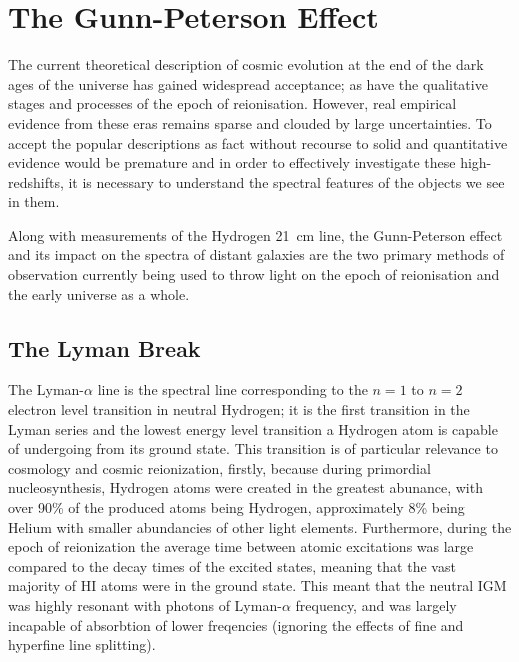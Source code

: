 
\section{The Gunn-Peterson Effect} %
\label{sec:the_gunn_peterson_effect}
	The current theoretical description of cosmic evolution at the end of the dark ages of the universe has gained widespread acceptance; as have the qualitative stages and processes of the epoch of reionisation. However, real empirical evidence from these eras remains sparse and clouded by large uncertainties. To accept the popular descriptions as fact without recourse to solid and quantitative evidence would be premature and in order to effectively investigate these high-redshifts, it is necessary to understand the spectral features of the objects we see in them.

	Along with measurements of the Hydrogen \SI{21}{\centi\metre} line, the Gunn-Peterson effect and its impact on the spectra of distant galaxies are the two primary methods of observation currently being used to throw light on the epoch of reionisation and the early universe as a whole.

	\subsection{The Lyman Break} %
	\label{sub:the_lyman_break}
		The Lyman-$\alpha$ line is the spectral line corresponding to the $n=1$ to $n=2$ electron level transition in neutral Hydrogen; it is the first transition in the Lyman series and the lowest energy level transition a Hydrogen atom is capable of undergoing from its ground state. This transition is of particular relevance to cosmology and cosmic reionization, firstly, because during primordial nucleosynthesis, Hydrogen atoms were created in the greatest abunance, with over 90\% of the produced atoms being Hydrogen, approximately 8\% being Helium with smaller abundancies of other light elements. Furthermore, during the epoch of reionization the average time between atomic excitations was large compared to the decay times of the excited states, meaning that the vast majority of HI atoms were in the ground state. This meant that the neutral IGM was highly resonant with photons of Lyman-$\alpha$ frequency, and was largely incapable of absorbtion of lower freqencies (ignoring the effects of fine and hyperfine line splitting).

